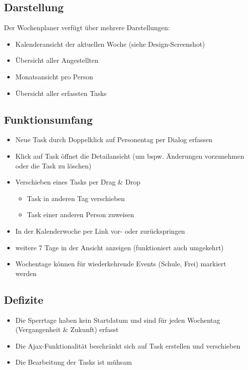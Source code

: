 \subsection{Darstellung}
Der Wochenplaner verfügt über mehrere Darstellungen:
\begin{itemize}
    \item Kalenderansicht der aktuellen Woche (siehe Design-Screenshot)
    \item Übersicht aller Angestellten
    \item Monatsansicht pro Person
    \item Übersicht aller erfassten Tasks
\end{itemize}

\subsection{Funktionsumfang}
\begin{itemize}
    \item Neue Task durch Doppelklick auf Personentag per Dialog erfassen
    \item Klick auf Task öffnet die Detailansicht (um bspw. Änderungen vorzunehmen oder die Task zu löschen)
    \item Verschieben eines Tasks per Drag \& Drop
    \begin{itemize}
        \item Task in anderen Tag verschieben
        \item Task einer anderen Person zuweisen
    \end{itemize}
    \item In der Kalenderwoche per Link vor- oder zurückspringen
    \item weitere 7 Tage in der Ansicht anzeigen (funktioniert auch umgekehrt)
    \item Wochentage können für wiederkehrende Events (Schule, Frei) markiert werden
\end{itemize}
\subsection{Defizite}
    \begin{itemize}
        \item Die Sperrtage haben kein Startdatum und sind für jeden Wochentag (Vergangenheit \& Zukunft) erfasst
        \item Die Ajax-Funktionalität beschränkt sich auf Task erstellen und verschieben
        \item Die Bearbeitung der Tasks ist mühsam
    \end{itemize}

